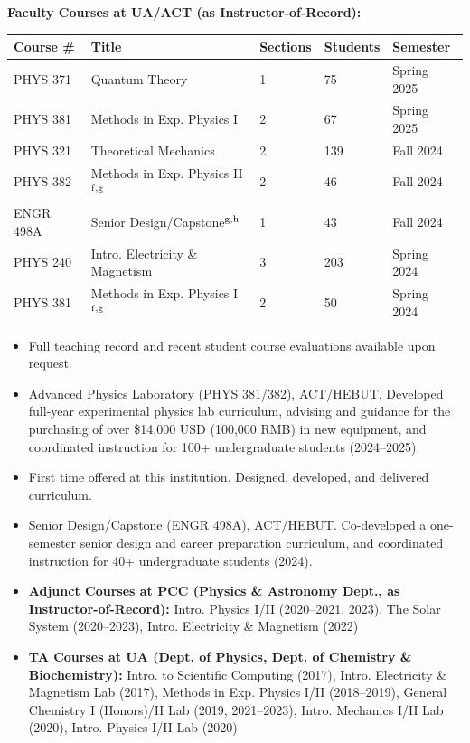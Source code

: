 \documentclass[11pt]{article}
\begin{document}
\textbf{Faculty Courses at UA/ACT (as Instructor-of-Record):}\\
{\normalsize
\begin{tabular}{@{}p{2.5cm} p{6.0cm} p{2.0cm} p{2.0cm} p{3.0cm}@{}}
    \toprule
    \textbf{Course \#} & \textbf{Title} & \textbf{Sections} & \textbf{Students} & \textbf{Semester} \\
    \midrule
    PHYS 371 & Quantum Theory & 1 & 75 & Spring 2025 \\
    PHYS 381 & Methods in Exp. Physics I & 2 & 67 & Spring 2025 \\
    PHYS 321 & Theoretical Mechanics & 2 & 139 & Fall 2024 \\
    PHYS 382 & Methods in Exp. Physics II\(^{\rm f,g}\) & 2 & 46 & Fall 2024 \\
    ENGR 498A & Senior Design/Capstone\(^{\rm g,h}\) & 1 & 43 & Fall 2024 \\
    PHYS 240 & Intro. Electricity \& Magnetism & 3 & 203 & Spring 2024 \\
    PHYS 381 & Methods in Exp. Physics I\(^{\rm f,g}\) & 2 & 50 & Spring 2024 \\
    \bottomrule
\end{tabular}
}

\begin{itemize}[leftmargin=*,nosep]
    \item[\(^{\rm e}\)] {\small Full teaching record and recent student course evaluations available upon request.}
    \item[\(^{\rm f}\)] {\small Advanced Physics Laboratory (PHYS 381/382), ACT\slash HEBUT. Developed full-year experimental physics lab curriculum, advising and guidance for the purchasing of over \$14,000 USD (\textyen{}100,000 RMB) in new equipment, and coordinated instruction for 100+ undergraduate students (2024--2025).}
    \item[\(^{\rm g}\)] {\small First time offered at this institution. Designed, developed, and delivered curriculum.}
    \item[\(^{\rm h}\)] {\small Senior Design/Capstone (ENGR 498A), ACT\slash HEBUT. Co-developed a one-semester senior design and career preparation curriculum, and coordinated instruction for 40+ undergraduate students (2024).}
\end{itemize}

\begin{itemize}[leftmargin=*,nosep]
    \item \textbf{Adjunct Courses at PCC (Physics \& Astronomy Dept., as Instructor-of-Record):} Intro. Physics I/II (2020--2021, 2023), The Solar System (2020--2023), Intro. Electricity \& Magnetism (2022)
    \item \textbf{TA Courses at UA (Dept. of Physics, Dept. of Chemistry \& Biochemistry):} Intro. to Scientific Computing (2017), Intro. Electricity \& Magnetism Lab (2017), Methods in Exp. Physics I/II (2018--2019), General Chemistry I (Honors)/II Lab (2019, 2021--2023), Intro. Mechanics I/II Lab (2020), Intro. Physics I/II Lab (2020)
\end{itemize}
\end{document}
